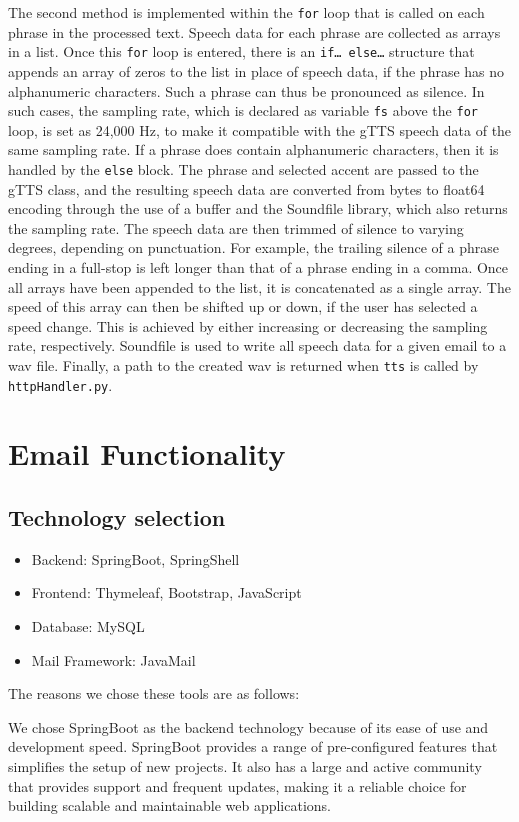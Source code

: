 \documentclass{article}
\begin{document}
The second method is implemented within the \texttt{for} loop that is called on each phrase in the processed text. Speech data for each phrase are collected as arrays in a list. Once this \texttt{for} loop is entered, there is an \texttt{if… else…} structure that appends an array of zeros to the list in place of speech data, if the phrase has no alphanumeric characters. Such a phrase can thus be pronounced as silence. In such cases, the sampling rate, which is declared as variable \texttt{fs} above the \texttt{for} loop, is set as 24,000 Hz, to make it compatible with the gTTS speech data of the same sampling rate. If a phrase does contain alphanumeric characters, then it is handled by the \texttt{else} block. The phrase and selected accent are passed to the gTTS class, and the resulting speech data are converted from bytes to float64 encoding through the use of a buffer and the Soundfile library, which also returns the sampling rate. The speech data are then trimmed of silence to varying degrees, depending on punctuation. For example, the trailing silence of a phrase ending in a full-stop is left longer than that of a phrase ending in a comma. Once all arrays have been appended to the list, it is concatenated as a single array. The speed of this array can then be shifted up or down, if the user has selected a speed change. This is achieved by either increasing or decreasing the sampling rate, respectively. Soundfile is used to write all speech data for a given email to a wav file. Finally, a path to the created wav is returned when \texttt{tts} is called by \texttt{httpHandler.py}.

\section{Email Functionality}
\subsection{Technology selection}
\begin{itemize}
    \item Backend: SpringBoot, SpringShell
    \item Frontend: Thymeleaf, Bootstrap, JavaScript
    \item Database: MySQL
    \item Mail Framework: JavaMail
\end{itemize}
The reasons we chose these tools are as follows:

We chose SpringBoot as the backend technology because of its ease of use and development speed. SpringBoot provides a range of pre-configured features that simplifies the setup of new projects. It also has a large and active community that provides support and frequent updates, making it a reliable choice for building scalable and maintainable web applications.
\end{document}
